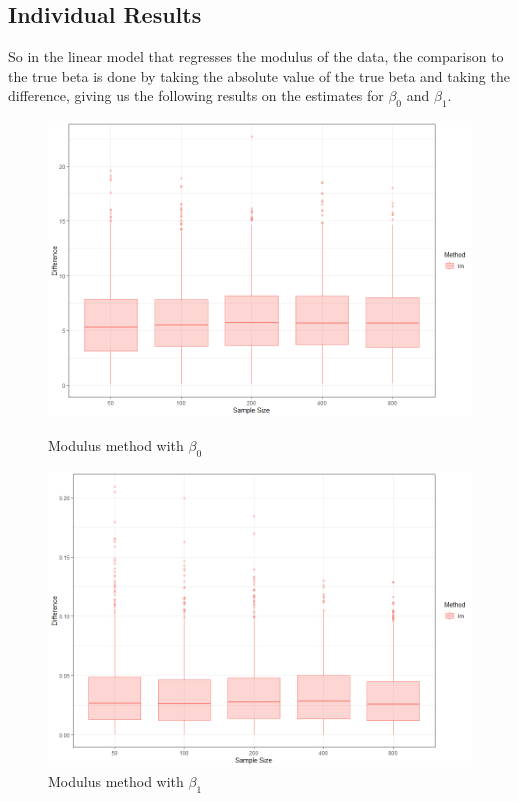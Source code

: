 \documentclass[honours,12pt]{unswthesis}
\numberwithin{equation}{section}
\begin{document}

\subsection{Individual Results}

So in the linear model that regresses the modulus of the data, the comparison to the true beta is done by taking the absolute value of the true beta and taking the difference, giving us the following results on the estimates for $\beta_{0}$ and $\beta_{1}$.

\begin{figure}[hpb]
    \centering
    \begin{minipage}{0.5\textwidth}
        \centering
        \includegraphics[width=\textwidth]{graphics/b0_lm}
        \caption{Modulus method with $\beta_{0}$}
    \end{minipage}\hfill
    \begin{minipage}{0.5\textwidth}
        \centering
        \includegraphics[width=\textwidth]{graphics/b1_lm} 
        \caption{Modulus method with $\beta_{1}$}
    \end{minipage}
\end{figure}
\end{document}
